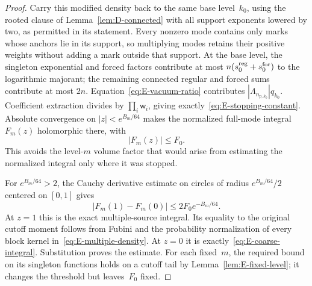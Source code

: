 \begin{proof}
Carry this modified density back to the same base level~$k_0$, using the rooted clause of Lemma~\ref{lem:D-connected} with all support exponents lowered by two, as permitted in its statement. Every nonzero mode contains only marks whose anchors lie in its support, so multiplying modes retains their positive weights without adding a mark outside that support. At the base level, the singleton exponential and forced factors contribute at most $n(s_0^{\rm reg}+s_0^{\rm for})$ to the logarithmic majorant; the remaining connected regular and forced sums contribute at most $2n$. Equation~\eqref{eq:E-vacuum-ratio} contributes $|\Lambda_{n_{p,k_0}}|q_{k_0}$. Coefficient extraction divides by $\prod_i\mathsf w_i$, giving exactly~\eqref{eq:E-stopping-constant}. Absolute convergence on $|z|<e^{B_m/64}$ makes the normalized full-mode integral $F_m(z)$ holomorphic there, with
\begin{equation*}
 |F_m(z)|\le F_0.
\end{equation*}
This avoids the level-$m$ volume factor that would arise from estimating the normalized integral only where it was stopped.

For $e^{B_m/64}>2$, the Cauchy derivative estimate on circles of radius $e^{B_m/64}/2$ centered on $[0,1]$ gives
\begin{equation*}
 |F_m(1)-F_m(0)|\le2F_0e^{-B_m/64}.
\end{equation*}
At $z=1$ this is the exact multiple-source integral. Its equality to the original cutoff moment follows from Fubini and the probability normalization of every block kernel in~\eqref{eq:E-multiple-density}. At $z=0$ it is exactly~\eqref{eq:E-coarse-integral}. Substitution proves the estimate. For each fixed~$m$, the required bound on its singleton functions holds on a cutoff tail by Lemma~\ref{lem:E-fixed-level}; it changes the threshold but leaves~$F_0$ fixed.
\end{proof}
